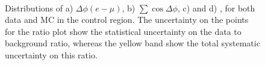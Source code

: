 \begin{figure}[ht!]
     \begin{center}

        \\

    \end{center}
    \caption{Distributions of a) $\Delta\phi(e-\mu)$,
      b) $\sum\cos\Delta\phi$, c) \SumLtMET and d) \Ht , for both data and MC in the \ttbar control region. The uncertainty on the points for the ratio plot show the statistical uncertainty on the data to background ratio, whereas the yellow band show the total systematic uncertainty on this ratio.}
   \label{fig:cutsttbar}
\end{figure}


